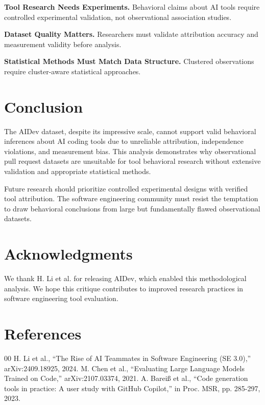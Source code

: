 \documentclass[conference]{IEEEtran}
\begin{document}
\textbf{Tool Research Needs Experiments.} Behavioral claims about AI tools require controlled experimental validation, not observational association studies.

\textbf{Dataset Quality Matters.} Researchers must validate attribution accuracy and measurement validity before analysis.

\textbf{Statistical Methods Must Match Data Structure.} Clustered observations require cluster-aware statistical approaches.

\section{Conclusion}
The AIDev dataset, despite its impressive scale, cannot support valid behavioral inferences about AI coding tools due to unreliable attribution, independence violations, and measurement bias. This analysis demonstrates why observational pull request datasets are unsuitable for tool behavioral research without extensive validation and appropriate statistical methods.

Future research should prioritize controlled experimental designs with verified tool attribution. The software engineering community must resist the temptation to draw behavioral conclusions from large but fundamentally flawed observational datasets.

\section*{Acknowledgments}
We thank H. Li et al. for releasing AIDev, which enabled this methodological analysis. We hope this critique contributes to improved research practices in software engineering tool evaluation.

\section*{References}
\begin{thebibliography}{00}
 H. Li et al., ``The Rise of AI Teammates in Software Engineering (SE 3.0),'' arXiv:2409.18925, 2024.
 M. Chen et al., ``Evaluating Large Language Models Trained on Code,'' arXiv:2107.03374, 2021.
 A. Bareiß et al., ``Code generation tools in practice: A user study with GitHub Copilot,'' in Proc. MSR, pp. 285-297, 2023.
\end{thebibliography}

\balance
\end{document}
